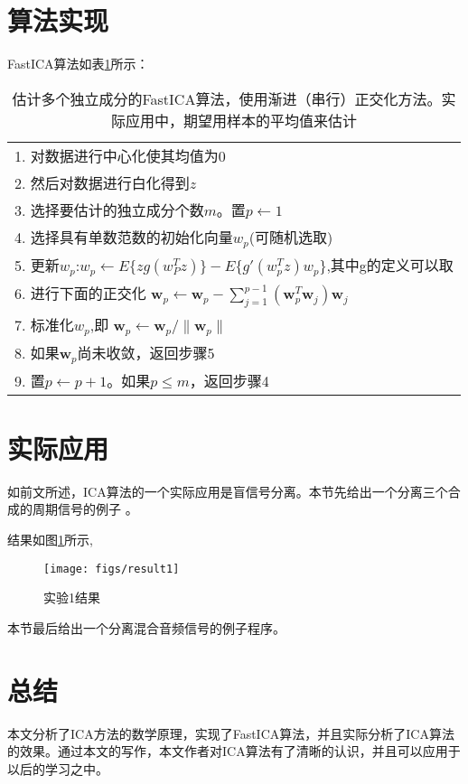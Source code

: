\documentclass[UTF8,zihao=5]{ctexart}
\begin{document}




\section{算法实现}

FastICA算法如表\ref{fast_ica_alg}所示：

\begin{table}[h]
    \centering
    \begin{tabular}{l}
        \hline 
        1. 对数据进行中心化使其均值为0\\
        2. 然后对数据进行白化得到$z$\\
        3. 选择要估计的独立成分个数$m$。置$p\leftarrow 1$\\
        4. 选择具有单数范数的初始化向量$w_p$(可随机选取)\\
        5. 更新$w_p$:$w_p\leftarrow E\{zg(w_P^T z)\}-E\{g'(w_p^T z)w_p\}$,其中g的定义可以取\\
        6. 进行下面的正交化
        $\mathbf{w}_p\leftarrow \mathbf{w}_p-\sum_{j=1}^{p-1}(\mathbf{w}_p^T \mathbf{w}_j)\mathbf{w}_j$ \\
        7. 标准化$w_p$,即 $\mathbf{w}_p\leftarrow \mathbf{w}_p/\lVert \mathbf{w}_p \rVert$\\
        8. 如果$\mathbf{w}_p$尚未收敛，返回步骤5\\
        9. 置$p\leftarrow p+1$。如果$p\leq m$，返回步骤4\\
        \hline 
    \end{tabular} 
    \caption{估计多个独立成分的FastICA算法，使用渐进（串行）正交化方法。实际应用中，期望用样本的平均值来估计}
    \label{fast_ica_alg}
\end{table}




\section{实际应用}
如前文所述，ICA算法的一个实际应用是盲信号分离。本节先给出一个分离三个合成的周期信号的例子\cite{example} 。


结果如图\ref{fig:result1}所示,

\begin{figure}[ht]
    \centering
    \texttt{[image: figs/result1]}
    \caption{实验1结果}
    \label{fig:result1}
\end{figure}

本节最后给出一个分离混合音频信号的例子程序。

\section{总结}
本文分析了ICA方法的数学原理，实现了FastICA算法，并且实际分析了ICA算法的效果。通过本文的写作，本文作者对ICA算法有了清晰的认识，并且可以应用于以后的学习之中。

% 

\end{document}
